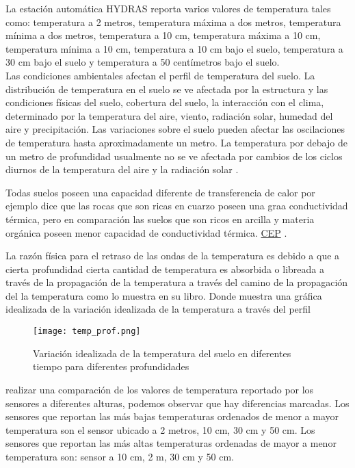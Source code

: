 \documentclass[11pt]{article}
\begin{document}
La estación automática HYDRAS reporta varios valores de temperatura tales como: temperatura a 2 metros, temperatura máxima a dos metros, temperatura mínima a dos metros, temperatura a 10 cm, temperatura máxima a 10 cm, temperatura mínima a 10 cm, temperatura a 10 cm bajo el suelo, temperatura a 30 cm bajo el suelo y temperatura a 50 centímetros bajo el suelo.\\

Las condiciones ambientales afectan el perfil de temperatura del suelo. La distribución de temperatura en el suelo se ve afectada por la estructura y las condiciones físicas del suelo, cobertura del suelo, la interacción con el clima, determinado por la temperatura del aire, viento, radiación solar, humedad del aire y precipitación. Las variaciones sobre el suelo pueden afectar las oscilaciones de temperatura hasta aproximadamente un metro. La temperatura por debajo de  un metro de profundidad usualmente no se ve afectada por cambios de los ciclos diurnos de la temperatura del aire y la radiación solar \citep{florides2005}.

Todas suelos poseen una capacidad diferente de transferencia de calor por ejemplo \citet{florides2005} dice que las rocas que son ricas en cuarzo poseen una graa conductividad térmica, pero en comparación las suelos que son ricos en arcilla y materia orgánica poseen menor capacidad de conductividad térmica. \textcolor{blue}{ \href{http://ces.iisc.ernet.in/hpg/envis/Remote/section994.htm}{CEP}} \citep{CES2000}.

La razón física para el retraso de las ondas de la temperatura es debido a que a cierta profundidad cierta cantidad de temperatura es absorbida o libreada a través de la propagación de la temperatura a través del camino de la propagación del la temperatura como lo muestra \citet{hillel2013} en su libro. Donde muestra una gráfica idealizada de la variación idealizada de la temperatura a través del perfil 

\begin{figure}[H]
	\begin{center}
\texttt{[image: temp\_prof.png]}
	\caption{Variación idealizada de la temperatura del suelo en diferentes tiempo para diferentes profundidades}
	 \label{gra:tmp_soil}
	\end{center}
\end{figure}

realizar una comparación de los valores de temperatura reportado por los sensores a diferentes alturas, podemos observar que hay diferencias marcadas. Los sensores que reportan las más bajas temperaturas ordenados de menor a mayor temperatura son el sensor ubicado a 2 metros, 10 cm, 30 cm y 50 cm. Los sensores que reportan las más altas temperaturas ordenadas de mayor a menor temperatura son: sensor a 10 cm, 2 m, 30 cm y 50 cm.
\end{document}
